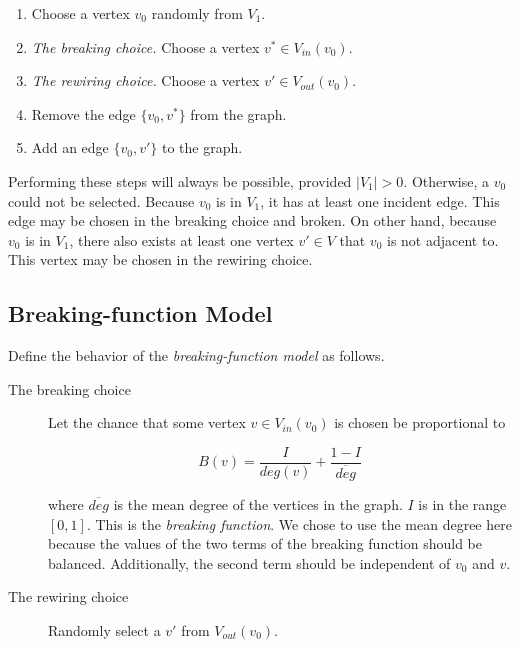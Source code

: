 \documentclass[a4paper,10pt]{article}
\begin{document}
\begin{enumerate}
 \item Choose a vertex $v_0$ randomly from $V_1$. 
 \item \emph{The breaking choice.} Choose a vertex $v^* \in V_{in}(v_0)$. 
 \item \emph{The rewiring choice.} Choose a vertex $v' \in V_{out}(v_0)$.
 \item Remove the edge $\{v_0, v^*\}$ from the graph.
 \item Add an edge $\{v_0, v'\}$ to the graph.

\end{enumerate}

Performing these steps will always be possible, provided $|V_1| > 0$. Otherwise, a $v_0$ could not be selected. Because $v_0$ is in $V_1$, it has at least one incident edge. This edge may be chosen in the breaking choice and broken. On other hand, because $v_0$ is in $V_1$, there also exists at least one vertex $v' \in V$ that $v_0$ is not adjacent to. This vertex may be chosen in the rewiring choice. 

\subsection{Breaking-function Model}

Define the behavior of the \emph{breaking-function model} as follows.

\begin{description}
 \item[The breaking choice]

 Let the chance that some vertex $v \in V_{in}(v_0)$ is chosen be proportional to

 \begin{equation}
\label{eqn:breaking-function}
 B(v) = \frac{I}{deg(v)} + \frac{1 - I}{\overline{deg}}
 \end{equation}

where $\overline{deg}$ is the mean degree of the vertices in the graph. $I$ is in the range $[0, 1]$. This is the \emph{breaking function}. We chose to use the mean degree here because the values of the two terms of the breaking function should be balanced. Additionally, the second term should be independent of $v_0$ and $v$.

 \item[The rewiring choice] Randomly select a $v'$ from $V_{out}(v_0)$.
\end{description}
\end{document}
